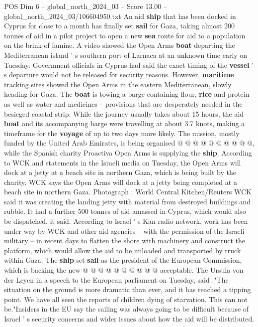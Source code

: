 \begin{textsample}{POS Dim 6 – global\_north\_2024\_03 – Score 13.00 – global\_north\_2024\_03/106604950.txt}  \label{ex:f6_pos_051}
An aid \textbf{ship} that has been docked in Cyprus for close to a month has finally set \textbf{sail} for Gaza, taking almost 200 tonnes of aid in a pilot project to open a new \textbf{sea} route for aid to a population on the brink of famine.
A video showed the Open Arms \textbf{boat} departing the Mediterranean island ' s southern port of Larnaca at an unknown time early on Tuesday.
Government officials in Cyprus had said the exact timing of the \textbf{vessel} ' s departure would not be released for security reasons.
However, \textbf{maritime} tracking sites showed the Open Arms in the eastern Mediterranean, slowly heading for Gaza.
The \textbf{boat} is towing a barge containing flour, \textbf{rice} and protein as well as water and medicines -- provisions that are desperately needed in the besieged coastal strip.
While the journey usually takes about 15 hours, the aid \textbf{boat} and its accompanying barge were travelling at about 3.7 knots, making a timeframe for the \textbf{voyage} of up to two days more likely.
The mission, mostly funded by the United Arab Emirates, is being organised @ @ @ @ @ @ @ @ @ @, while the Spanish charity Proactiva Open Arms is supplying the \textbf{ship}.
According to WCK and statements in the Israeli media on Tuesday, the Open Arms will dock at a jetty at a beach site in northern Gaza, which is being built by the charity.
WCK says the Open Arms will dock at a jetty being completed at a beach site in northern Gaza.
Photograph : World Central Kitchen/Reuters WCK said it was creating the landing jetty with material from destroyed buildings and rubble.
It had a further 500 tonnes of aid amassed in Cyprus, which would also be dispatched, it said.
According to Israel ' s Kan radio network, work has been under way by WCK and other aid agencies -- with the permission of the Israeli military -- in recent days to flatten the shore with machinery and construct the platform, which would allow the aid to be unloaded and transported by truck within Gaza.
The \textbf{ship} set \textbf{sail} as the president of the European Commission, which is backing the new @ @ @ @ @ @ @ @ @ @ acceptable.
The Ursula von der Leyen in a speech to the European parliament on Tuesday, said :"The situation on the ground is more dramatic than ever, and it has reached a tipping point.
We have all seen the reports of children dying of starvation.
This can not be."Insiders in the EU say the sailing was always going to be difficult because of Israel ' s security concerns and wider issues about how the aid will be distributed.

\end{textsample}
